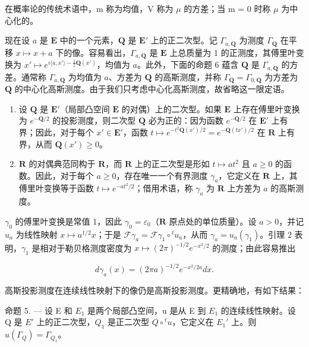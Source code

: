在概率论的传统术语中，m 称为均值，V 称为 \(\mu\) 的方差；当 m = 0 时称 \(\mu\) 为中心化的。

现在设 \(a\) 是 \(\mathbf{E}\) 中的一个元素，\(\mathbf{Q}\) 是 \(\mathbf{E}'\) 上的正二次型。记 \(\Gamma_{a,\mathbf{Q}}\) 为测度 \(\Gamma_{\mathbf{Q}}\) 在平移 \(x \mapsto x + a\) 下的像。容易看出，\(\Gamma_{a,\mathbf{Q}}\) 是 \(\mathbf{E}\) 上总质量为 1 的正测度，其傅里叶变换为 \(x' \mapsto e^{i\langle a,x'\rangle - \frac{1}{2}\mathbf{Q}(x')}\)，均值为 \(a\)。此外，下面的命题 6 蕴含 \(\mathbf{Q}\) 是 \(\Gamma_{a,\mathbf{Q}}\) 的方差。通常称 \(\Gamma_{a,\mathbf{Q}}\) 为均值为 \(a\)、方差为 \(\mathbf{Q}\) 的高斯测度，并称 \(\Gamma_{\mathbf{Q}} = \Gamma_{0,\mathbf{Q}}\) 为方差为 \(\mathbf{Q}\) 的中心化高斯测度。由于我们只考虑中心化高斯测度，故省略这一限定语。

\begin{enumerate}
\def\labelenumi{\arabic{enumi})}
\setcounter{enumi}{1}
\item
  设 \(\mathbf{Q}\) 是 \(\mathbf{E}'\)（局部凸空间 \(\mathbf{E}\) 的对偶）上的二次型。如果 \(\mathbf{E}\) 上存在傅里叶变换为 \(e^{-\mathbf{Q} / 2}\) 的投影测度，则二次型 \(\mathbf{Q}\) 必为正的：因为函数 \(e^{-\mathbf{Q} / 2}\) 在 \(\mathbf{E}'\) 上有界；因此，对于每个 \(x' \in \mathbf{E}'\)，函数 \(t \mapsto e^{-t^2\mathbf{Q}(x') / 2} = e^{-\mathbf{Q}(tx') / 2}\) 在 \(\mathbf{R}\) 上有界，从而 \(\mathbf{Q}(x') \geqslant 0\)。
\item
  \(\mathbf{R}\) 的对偶典范同构于 \(\mathbf{R}\)，而 \(\mathbf{R}\) 上的正二次型是形如 \(t \mapsto at^2\) 且 \(a \geqslant 0\) 的函数。因此，对于每个 \(a \geqslant 0\)，存在唯一一个有界测度 \(\gamma_a\)，它定义在 \(\mathbf{R}\) 上，其傅里叶变换等于函数 \(t \mapsto e^{-at^2/2}\)；借用术语，称 \(\gamma_a\) 为 \(\mathbf{R}\) 上方差为 \(a\) 的高斯测度。
\end{enumerate}

 \(\gamma_0\) 的傅里叶变换是常值 1，因此 \(\gamma_0 = \varepsilon_0\)（\(\mathbf{R}\) 原点处的单位质量）。设 \(a > 0\)，并记 \(u_a\) 为线性映射 \(x \mapsto a^{1/2}x\)；于是 \(\mathcal{F}\gamma_a = \mathcal{F}\gamma_1 \circ {}^t u_a\)，从而 \(\gamma_a = u_a(\gamma_1)\)。引理 2 表明，\(\gamma_1\) 是相对于勒贝格测度密度为 \(x \mapsto (2\pi)^{-1/2} e^{-x^2/2}\) 的测度；由此容易推出

\[
d \gamma_ {a} (x) = (2 \pi a) ^ {- 1 / 2} e ^ {- x ^ {2} / 2 a} d x.\tag{15}
\]

高斯投影测度在连续线性映射下的像仍是高斯投影测度。更精确地，有如下结果：

命题 5. --- 设 E 和 \(E_{1}\) 是两个局部凸空间，u 是从 E 到 \(E_{1}\) 的连续线性映射。设 Q 是 \(E'\) 上的正二次型，\(Q_{1}\) 是正二次型 \(Q \circ {}^{t}u\)，它定义在 \(E_{1}'\) 上。则 \(u(\Gamma_{Q}) = \Gamma_{Q_{1}}\)。

